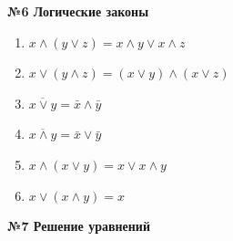     \begin{center}
        \textbf{№6 Логические законы}
    \end{center}

    \begin{enumerate}
        \item $x \wedge (y \vee z) = x \wedge y \vee x \wedge z$
        \item $x \vee (y \wedge z) = (x \vee y) \wedge (x \vee z)$
        \item $\overline{x \vee y} = \bar x \wedge \bar y$
        \item $\overline{x \wedge y} = \bar x \vee \bar y$
        \item $x \wedge (x \vee y) = x \vee x \wedge y$
        \item $x \vee (x \wedge y) = x$
    \end{enumerate}

    \begin{center}
        \textbf{№7 Решение уравнений}
    \end{center}

